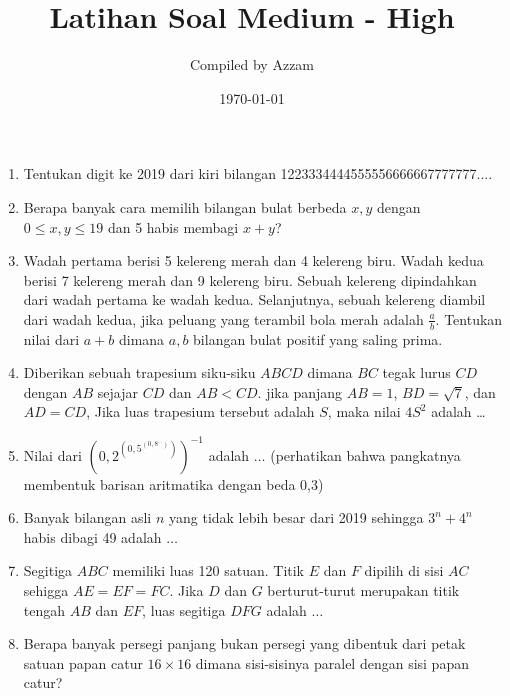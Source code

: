 \documentclass[12pt]{scrartcl}
\begin{document}
	\title{Latihan Soal Medium - High} %
	\date{\today}
	\author{Compiled by Azzam}
	\maketitle

\renewcommand*\contentsname{Daftar Isi}
\tableofcontents

\newpage
	\begin{enumerate}
		\item
		Tentukan digit ke 2019 dari kiri bilangan 1223334444555556666667777777....
		
		\item
		Berapa banyak cara memilih bilangan bulat berbeda $x, y$ dengan $0 \le x, y \le 19$ dan 5 habis membagi $x + y$?
		
		\item
		Wadah pertama berisi 5 kelereng merah dan 4 kelereng biru. Wadah kedua berisi 7 kelereng merah dan
		9 kelereng biru. Sebuah kelereng dipindahkan dari wadah pertama ke wadah kedua. Selanjutnya, sebuah
		kelereng diambil dari wadah kedua, jika peluang yang terambil bola merah adalah
		$\frac{a}{b}$. Tentukan nilai dari $a+b$ dimana $a, b$ bilangan bulat positif yang saling prima.
		
		\item
		Diberikan sebuah trapesium siku-siku $ABCD$ dimana $BC$ tegak lurus $CD$ dengan $AB$ sejajar $CD$ dan $AB < CD$. jika panjang $AB = 1$, $BD = \sqrt{7}$, dan $AD = CD$, Jika luas trapesium tersebut adalah $S$, maka nilai $4S^2$ adalah \dots
		
		\item Nilai dari $\left(0,2 ^{\left(0,5 ^{\left(0,8 ^{...} \right)} \right)} \right)^{-1}$ adalah $\dots$ (perhatikan bahwa pangkatnya membentuk barisan aritmatika dengan beda 0,3)
		
		\item Banyak bilangan asli $n$ yang tidak lebih besar dari 2019 sehingga $3^n+4^n$ habis dibagi 49 adalah $\dots$
		
		\item Segitiga $ABC$ memiliki luas 120 satuan. Titik $E$ dan $F$ dipilih di sisi $AC$ sehigga $AE=EF=FC$. Jika $D$ dan $G$ berturut-turut merupakan titik tengah $AB$ dan $EF$, luas segitiga $DFG$ adalah $\dots$
		
		\item
		Berapa banyak persegi panjang bukan persegi yang dibentuk dari petak satuan papan catur $16 \times 16$ dimana sisi-sisinya paralel dengan sisi papan catur?


\end{enumerate}
\end{document}
